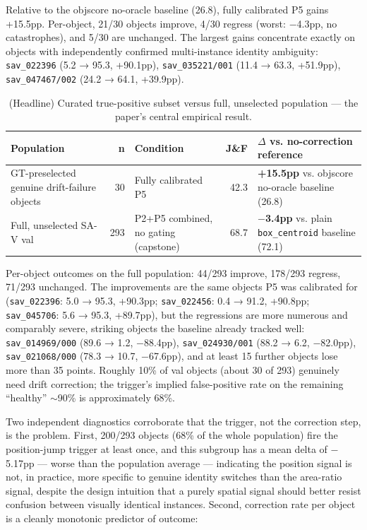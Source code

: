 \documentclass[11pt]{article}
\begin{document}
Relative to the objscore no-oracle baseline (26.8), fully calibrated P5 gains +15.5pp. Per-object, 21/30 objects improve, 4/30 regress (worst: $-$4.3pp, no catastrophes), and 5/30 are unchanged. The largest gains concentrate exactly on objects with independently confirmed multi-instance identity ambiguity: \texttt{sav\_022396} (5.2 → 95.3, +90.1pp), \texttt{sav\_035221/001} (11.4 → 63.3, +51.9pp), \texttt{sav\_047467/002} (24.2 → 64.1, +39.9pp).

\begin{table}[!htbp]
\centering
\caption{(Headline) Curated true-positive subset versus full, unselected population — the paper's central empirical result.}
\label{tab:5}
\small
\begin{tabularx}{\textwidth}{@{}LrLrL@{}}
\toprule
Population & n & Condition & J\&F & $\Delta$ vs. no-correction reference \\
\midrule
GT-preselected genuine drift-failure objects & 30 & Fully calibrated P5 & 42.3 & \textbf{+15.5pp} vs. objscore no-oracle baseline (26.8) \\
Full, unselected SA-V val & 293 & P2+P5 combined, no gating (capstone) & 68.7 & \textbf{$-$3.4pp} vs. plain \texttt{box\_centroid} baseline (72.1) \\
\bottomrule
\end{tabularx}
\end{table}

Per-object outcomes on the full population: 44/293 improve, 178/293 regress, 71/293 unchanged. The improvements are the same objects P5 was calibrated for (\texttt{sav\_022396}: 5.0 → 95.3, +90.3pp; \texttt{sav\_022456}: 0.4 → 91.2, +90.8pp; \texttt{sav\_045706}: 5.6 → 95.3, +89.7pp), but the regressions are more numerous and comparably severe, striking objects the baseline already tracked well: \texttt{sav\_014969/000} (89.6 → 1.2, $-$88.4pp), \texttt{sav\_024930/001} (88.2 → 6.2, $-$82.0pp), \texttt{sav\_021068/000} (78.3 → 10.7, $-$67.6pp), and at least 15 further objects lose more than 35 points. Roughly 10\% of val objects (about 30 of 293) genuinely need drift correction; the trigger's implied false-positive rate on the remaining ``healthy'' $\sim$90\% is approximately 68\%.

Two independent diagnostics corroborate that the trigger, not the correction step, is the problem. First, 200/293 objects (68\% of the whole population) fire the position-jump trigger at least once, and this subgroup has a mean delta of $-$5.17pp — worse than the population average — indicating the position signal is not, in practice, more specific to genuine identity switches than the area-ratio signal, despite the design intuition that a purely spatial signal should better resist confusion between visually identical instances. Second, correction rate per object is a cleanly monotonic predictor of outcome:
\end{document}
